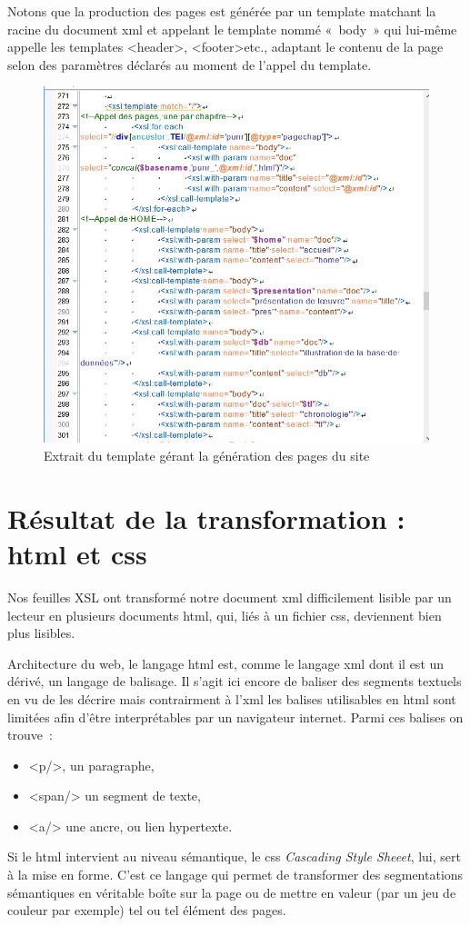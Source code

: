 \documentclass[12pt, a4paper]{article}
\begin{document}
Notons que la production des pages est générée par un template matchant la racine du document xml et appelant le template nommé «~body~» qui lui-même appelle les templates \go<header>\gf, \go<footer>\gf etc., adaptant le contenu de la page selon des paramètres déclarés au moment de l'appel du template.
\begin{figure}[H]
    \centering
    \includegraphics[scale=0.4]{img/screen_body.jpg}
    \caption{Extrait du template gérant la génération des pages du site}
    \label{fig:enter-label}
\end{figure}

\section{Résultat de la transformation : html et css}

\label{htmlCss}

Nos feuilles XSL ont transformé notre document xml difficilement lisible par un lecteur en plusieurs documents html, qui, liés à un fichier css, deviennent bien plus lisibles.

Architecture du web, le langage html est, comme le langage xml dont il est un dérivé, un langage de balisage. Il s'agit ici encore de baliser des segments textuels en vu de les décrire mais contrairment à l'xml les balises utilisables en html sont limitées afin d'être interprétables par un navigateur internet. Parmi ces balises on trouve~:
\begin{itemize}
    \item <p/>, un paragraphe,
    \item <span/> un segment de texte,
    \item <a/> une ancre, ou lien hypertexte.
\end{itemize}
Si le html intervient au niveau sémantique, le css \textit{Cascading Style Sheeet}, lui, sert à la mise en forme. C'est ce langage qui permet de transformer des segmentations sémantiques en véritable boîte sur la page ou de mettre en valeur (par un jeu de couleur par exemple) tel ou tel élément des pages.
\end{document}
